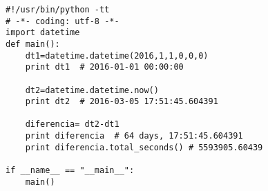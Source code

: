 \documentclass[ucs]{beamer}
\begin{document}
\begin{frame}[fragile]
\frametitle{}

  \begin{footnotesize}
  \begin{verbatim}
#!/usr/bin/python -tt
# -*- coding: utf-8 -*-
import datetime
def main():
    dt1=datetime.datetime(2016,1,1,0,0,0)
    print dt1  # 2016-01-01 00:00:00

    dt2=datetime.datetime.now()
    print dt2  # 2016-03-05 17:51:45.604391

    diferencia= dt2-dt1
    print diferencia  # 64 days, 17:51:45.604391
    print diferencia.total_seconds() # 5593905.60439

if __name__ == "__main__":
    main()
  \end{verbatim}
  \end{footnotesize}

\end{frame}
\end{document}
